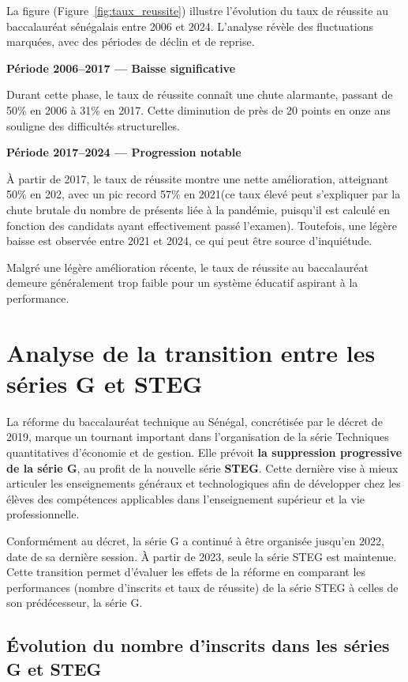 La figure (Figure~\ref{fig:taux_reussite}) illustre l’évolution du taux de réussite au baccalauréat sénégalais entre 2006 et 2024. 
L’analyse révèle des fluctuations marquées, avec des périodes de déclin et de reprise.


\textbf{Période 2006–2017 — Baisse significative}

Durant cette phase, le taux de réussite connaît une chute alarmante, passant de 50\% en 2006 à 31\% en 2017. 
Cette diminution de près de 20 points en onze ans souligne des difficultés structurelles.

\textbf{Période 2017–2024 — Progression notable}

À partir de 2017, le taux de réussite montre une nette amélioration, atteignant 50\% en 202, avec un pic record 57\% en 2021(ce taux élevé peut s'expliquer par la chute brutale du nombre de présents liée à la pandémie, puisqu'il est calculé en fonction des candidats ayant effectivement passé l’examen). 
Toutefois, une légère baisse est observée entre 2021 et 2024, ce qui peut être source d’inquiétude.

\bigskip

Malgré une légère amélioration récente, le taux de réussite au baccalauréat demeure généralement trop faible pour un système éducatif aspirant à la performance.

\newpage
\section{Analyse de la transition entre les séries G et STEG}

La réforme du baccalauréat technique au Sénégal, concrétisée par le décret de 2019, marque un tournant important dans l’organisation de la série Techniques quantitatives d’économie et de gestion.
Elle prévoit \textbf{la suppression progressive de la série G}, au profit de la nouvelle série \textbf{STEG}.
Cette dernière vise à mieux articuler les enseignements généraux et technologiques afin de développer chez les élèves des compétences applicables dans l’enseignement supérieur et la vie professionnelle.

Conformément au décret, la série G a continué à être organisée jusqu’en 2022, date de sa dernière session. À partir de 2023, seule la série STEG est maintenue. 
Cette transition permet d’évaluer les effets de la réforme en comparant les performances (nombre d’inscrits et taux de réussite) de la série STEG à celles de son prédécesseur, la série G.

\subsection{Évolution du nombre d'inscrits dans les séries G et STEG}

